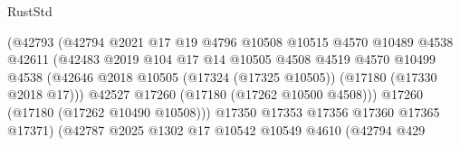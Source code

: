 \begin{lexlean}{RustStd}
\begin{coremodule}
{\begin{coremodule}
{{{{{{{{{{{{{{{{{{{{{{{{{{{{{{{{{{{{{{{{{{{{{{{{{{{{{{{                                          (@42793
                                            (@42794
                                              @2021
                                              @17
                                              @19
                                              @4796
                                              @10508
                                              @10515
                                              @4570
                                              @10489
                                              @4538
                                              @42611
                                              (@42483
                                                @2019
                                                @104
                                                @17
                                                @14
                                                @10505
                                                @4508
                                                @4519
                                                @4570
                                                @10499
                                                @4538
                                                (@42646
                                                  @2018
                                                  @10505
                                                  (@17324 (@17325 @10505))
                                                  (@17180 (@17330 @2018 @17)))
                                                @42527
                                                @17260
                                                (@17180 (@17262 @10500 @4508)))
                                              @17260
                                              (@17180 (@17262 @10490 @10508)))
                                            @17350
                                            @17353
                                            @17356
                                            @17360
                                            @17365
                                            @17371)
                                          (@42787
                                            @2025
                                            @1302
                                            @17
                                            @10542
                                            @10549
                                            @4610
                                            (@42794
                                              @429
}}}}}}}}}}}}}}}}}}}}}}}}}}}}}}}}}}}}}}}}}}}}}}}}}}}}}}}
\end{coremodule}}
\end{coremodule}
\end{lexlean}
